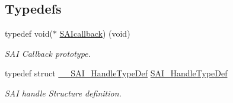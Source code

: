 \subsection*{Typedefs}
\begin{DoxyCompactItemize}
\item 
typedef void($\ast$ \hyperlink{group___s_a_i___exported___types_ga957c3e6366add9a5d3c516ceb0ed8058}{S\+A\+Icallback}) (void)\hypertarget{group___s_a_i___exported___types_ga957c3e6366add9a5d3c516ceb0ed8058}{}\label{group___s_a_i___exported___types_ga957c3e6366add9a5d3c516ceb0ed8058}

\begin{DoxyCompactList}\small\item\em S\+AI Callback prototype. \end{DoxyCompactList}\item 
typedef struct \hyperlink{struct_____s_a_i___handle_type_def}{\+\_\+\+\_\+\+S\+A\+I\+\_\+\+Handle\+Type\+Def} \hyperlink{group___s_a_i___exported___types_gaf45214e5c90f73800130b3945bf45144}{S\+A\+I\+\_\+\+Handle\+Type\+Def}\hypertarget{group___s_a_i___exported___types_gaf45214e5c90f73800130b3945bf45144}{}\label{group___s_a_i___exported___types_gaf45214e5c90f73800130b3945bf45144}

\begin{DoxyCompactList}\small\item\em S\+AI handle Structure definition. \end{DoxyCompactList}\end{DoxyCompactItemize}
